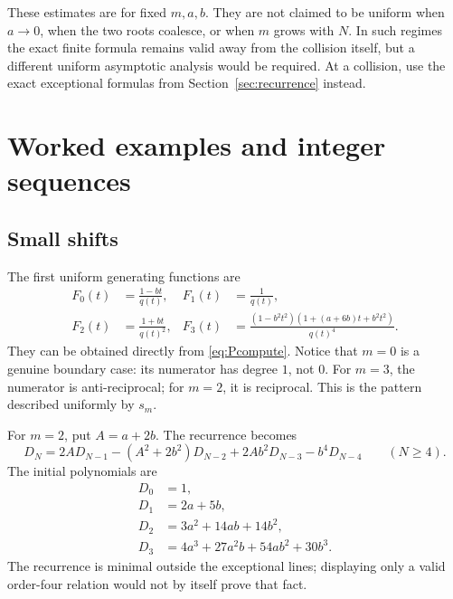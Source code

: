 \documentclass[11pt,a4paper]{article}
\numberwithin{equation}{section}
\theoremstyle{definition}
\theoremstyle{remark}
\begin{document}
These estimates are for fixed $m,a,b$.  They are not claimed to be
uniform when $a\to0$, when the two roots coalesce, or when $m$ grows
with $N$.  In such regimes the exact finite formula remains valid
away from the collision itself, but a different uniform asymptotic
analysis would be required.  At a collision, use the exact exceptional
formulas from Section~\ref{sec:recurrence} instead.

\section{Worked examples and integer sequences}\label{sec:examples}

\subsection{Small shifts}
The first uniform generating functions are
\begin{align}
 F_0(t)&=\frac{1-bt}{q(t)},&
 F_1(t)&=\frac1{q(t)},\label{eq:low01}\\
 F_2(t)&=\frac{1+bt}{q(t)^2},&
 F_3(t)&=\frac{(1-b^2t^2)(1+(a+6b)t+b^2t^2)}{q(t)^4}.
 \label{eq:low23}
\end{align}
They can be obtained directly from \eqref{eq:Pcompute}.  Notice that
$m=0$ is a genuine boundary case: its numerator has degree $1$, not $0$.
For $m=3$, the numerator is anti-reciprocal; for $m=2$, it is reciprocal.
This is the pattern described uniformly by $s_m$.

For $m=2$, put $A=a+2b$.  The recurrence becomes
\begin{equation}\label{eq:m2rec}
 D_N=2A D_{N-1}-(A^2+2b^2)D_{N-2}
         +2Ab^2D_{N-3}-b^4D_{N-4}\qquad(N\geq4).
\end{equation}
The initial polynomials are
\begin{align*}
 D_0&=1,\\
 D_1&=2a+5b,\\
 D_2&=3a^2+14ab+14b^2,\\
 D_3&=4a^3+27a^2b+54ab^2+30b^3.
\end{align*}
The recurrence is minimal outside the exceptional lines; displaying
only a valid order-four relation would not by itself prove that fact.
\end{document}
